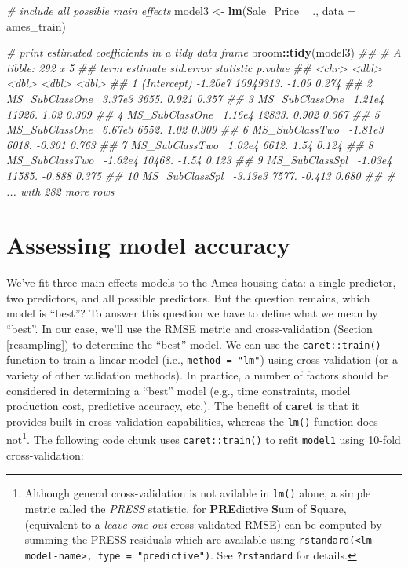 \documentclass[]{krantz}
\makeatletter
\newenvironment{Shaded}{\begin{snugshade}}{\end{snugshade}}
\newcommand{\CommentTok}[1]{\textcolor[rgb]{0.37,0.37,0.37}{\textit{#1}}}
\newcommand{\DataTypeTok}[1]{\textcolor[rgb]{0.27,0.27,0.27}{#1}}
\newcommand{\KeywordTok}[1]{\textcolor[rgb]{0.27,0.27,0.27}{\textbf{#1}}}
\newcommand{\NormalTok}[1]{#1}
\newcommand{\OperatorTok}[1]{\textcolor[rgb]{0.43,0.43,0.43}{\textbf{#1}}}
\newcommand{\StringTok}[1]{\textcolor[rgb]{0.5,0.5,0.5}{#1}}
\newenvironment{kframe}{%
\medskip{}
\setlength{\fboxsep}{.8em}
 \def\at@end@of@kframe{}%
 \ifinner\ifhmode%
  \def\at@end@of@kframe{\end{minipage}}%
  \begin{minipage}{\columnwidth}%
 \fi\fi%
 \def\FrameCommand##1{\hskip\@totalleftmargin \hskip-\fboxsep
 \colorbox{shadecolor}{##1}\hskip-\fboxsep
     \hskip-\linewidth \hskip-\@totalleftmargin \hskip\columnwidth}%
 \MakeFramed {\advance\hsize-\width
   \@totalleftmargin\z@ \linewidth\hsize
   \@setminipage}}%
 {\par\unskip\endMakeFramed%
 \at@end@of@kframe}
\renewenvironment{Shaded}{\begin{kframe}}{\end{kframe}}
\makeatother
\begin{document}
\begin{Shaded}
\begin{Highlighting}[]
\CommentTok{# include all possible main effects}
\NormalTok{model3 <-}\StringTok{ }\KeywordTok{lm}\NormalTok{(Sale_Price }\OperatorTok{~}\StringTok{ }\NormalTok{., }\DataTypeTok{data =}\NormalTok{ ames_train) }

\CommentTok{# print estimated coefficients in a tidy data frame}
\NormalTok{broom}\OperatorTok{::}\KeywordTok{tidy}\NormalTok{(model3)  }
\CommentTok{## # A tibble: 292 x 5}
\CommentTok{##    term            estimate std.error statistic p.value}
\CommentTok{##    <chr>              <dbl>     <dbl>     <dbl>   <dbl>}
\CommentTok{##  1 (Intercept)      -1.20e7 10949313.    -1.09    0.274}
\CommentTok{##  2 MS_SubClassOne~   3.37e3     3655.     0.921   0.357}
\CommentTok{##  3 MS_SubClassOne~   1.21e4    11926.     1.02    0.309}
\CommentTok{##  4 MS_SubClassOne~   1.16e4    12833.     0.902   0.367}
\CommentTok{##  5 MS_SubClassOne~   6.67e3     6552.     1.02    0.309}
\CommentTok{##  6 MS_SubClassTwo~  -1.81e3     6018.    -0.301   0.763}
\CommentTok{##  7 MS_SubClassTwo~   1.02e4     6612.     1.54    0.124}
\CommentTok{##  8 MS_SubClassTwo~  -1.62e4    10468.    -1.54    0.123}
\CommentTok{##  9 MS_SubClassSpl~  -1.03e4    11585.    -0.888   0.375}
\CommentTok{## 10 MS_SubClassSpl~  -3.13e3     7577.    -0.413   0.680}
\CommentTok{## # ... with 282 more rows}
\end{Highlighting}
\end{Shaded}

\hypertarget{assessing-model-accuracy}{%
\section{Assessing model accuracy}\label{assessing-model-accuracy}}

We've fit three main effects models to the Ames housing data: a single predictor, two predictors, and all possible predictors. But the question remains, which model is ``best''? To answer this question we have to define what we mean by ``best''. In our case, we'll use the RMSE metric and cross-validation (Section \ref{resampling}) to determine the ``best'' model. We can use the \texttt{caret::train()} function to train a linear model (i.e., \texttt{method\ =\ "lm"}) using cross-validation (or a variety of other validation methods). In practice, a number of factors should be considered in determining a ``best'' model (e.g., time constraints, model production cost, predictive accuracy, etc.). The benefit of \textbf{caret} is that it provides built-in cross-validation capabilities, whereas the \texttt{lm()} function does not\footnote{Although general cross-validation is not avilable in \texttt{lm()} alone, a simple metric called the \emph{PRESS} statistic, for \textbf{PRE}dictive \textbf{S}um of \textbf{S}quare, (equivalent to a \emph{leave-one-out} cross-validated RMSE) can be computed by summing the PRESS residuals which are available using \texttt{rstandard(\textless{}lm-model-name\textgreater{},\ type\ =\ "predictive")}. See \texttt{?rstandard} for details.}. The following code chunk uses \texttt{caret::train()} to refit \texttt{model1} using 10-fold cross-validation:
\end{document}
